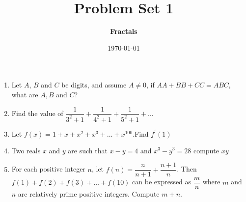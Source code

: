 \documentclass[a4paper]{article}
\begin{document}
\author{\textbf{Fractals}}
\title{\textbf{Problem Set 1}}
\date {\today}
\maketitle
\noindent
\begin{enumerate}
    \item Let $A$, $B$ and $C$ be digits, and assume $A\neq 0$, 
        if $AA + BB + CC = ABC$, what are $A, B$ and $C$?

    \item  Find the value of $\dfrac{1}{3^2+1}+
        \dfrac{1}{4^2+1}+\dfrac{1}{5^2+1} + \dots$

    \item Let $f(x) = 1 + x + x^2 + x^3 + \dots+ x^{100}$.Find $f^\prime(1)$
    \item Two reals $x$ and $y$ are such that $x - y = 4$ and $x^3 - y^3 = 28$ compute $xy$ 

    \item  For each positive integer $n$, let $f(n) = \dfrac{n}{n+1} + \dfrac{n+1}{n}$. Then $f (1) + f (2) + f (3) + 
    \dots + f (10)$ can be expressed as $\dfrac{m}{n}$ where $m$ and $n$ are relatively prime positive integers. Compute $m + n$.
\end{enumerate}
\end{document}
